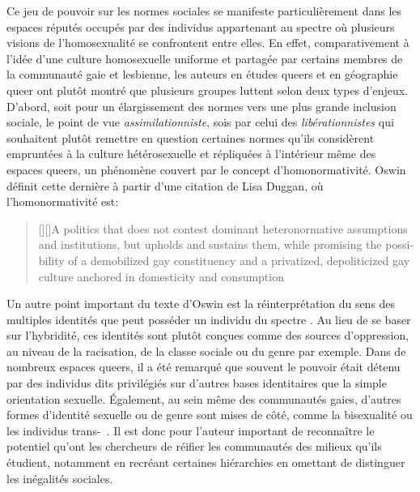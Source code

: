 Ce jeu de pouvoir sur les normes sociales se manifeste particulièrement dans les espaces réputés occupés par des individus appartenant au spectre \lgbt{} où plusieurs visions de l'homosexualité se confrontent entre elles. 
En effet, comparativement à l'idée d'une culture homosexuelle uniforme et partagée par certains membres de la communauté gaie et lesbienne, les auteurs en études queers et en géographie queer ont plutôt montré que plusieurs groupes luttent selon deux types d'enjeux.
D'abord, soit pour un élargissement des normes vers une plus grande inclusion sociale, le point de vue \emph{assimilationniste}, sois par celui des \emph{libérationnistes} qui souhaitent plutôt remettre en question certaines normes qu'ils considèrent empruntées à la culture hétérosexuelle et répliquées à l'intérieur même des espaces queers, un phénomène couvert par le concept d'homonormativité. 
Oswin définit cette dernière à partir d'une citation de Lisa Duggan, où l'homonormativité est: 
\foreignblockquote{english}[{\cite[tel que cité dans][92]{Oswin2008}}][]{[{\cite[50]{Duggan2003}}][]{A politics that does not contest dominant heteronormative assumptions and institutions, but upholds and sustains them, while promising the possibility of a demobilized gay constituency and a privatized, depoliticized gay culture anchored in domesticity and consumption}}.

Un autre point important du texte d'Oswin est la réinterprétation du sens des multiples identités que peut posséder un individu du spectre \lgbt{}. 
Au lieu de se baser sur l'hybridité, ces identités sont plutôt conçues comme des sources d'oppression, au niveau de la racisation, de la classe sociale ou du genre par exemple. 
Dans de nombreux espaces queers, il a été remarqué que souvent le pouvoir était détenu par des individus dits privilégiés sur d'autres bases identitaires que la simple orientation sexuelle. 
Également, au sein même des communautés gaies, d'autres formes d'identité sexuelle ou de genre sont mises de côté, comme la bisexualité ou les individus trans-~\citep[93]{Oswin2008}.
Il est donc pour l'auteur important de reconnaître le potentiel qu'ont les chercheurs de réifier les communautés des milieux qu'ils étudient, notamment en recréant certaines hiérarchies en omettant de distinguer les inégalités sociales.

